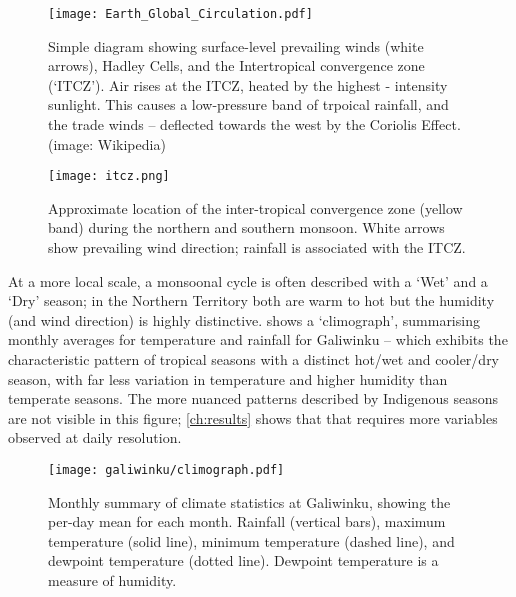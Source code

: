 \begin{figure}[p]
    \centering
    \texttt{[image: Earth\_Global\_Circulation.pdf]}
    \caption[Hadley Cells and trade-winds]{
        Simple diagram showing surface-level prevailing winds (white arrows),
        Hadley Cells, and the Intertropical convergence zone (`ITCZ').
        Air rises at the ITCZ, heated by the highest - intensity sunlight.
        This causes a low-pressure band of trpoical rainfall, and the
        trade winds -- deflected towards the west by the Coriolis Effect.
        (image: Wikipedia)}
    \label{fig:hadley-cells}
\vspace{1cm}
    \texttt{[image: itcz.png]}
    \caption[ITCZ showing northern and southern monsoon]{
        Approximate location of the inter-tropical convergence zone
        (yellow band) during the northern and southern monsoon.
        White arrows show prevailing wind direction; rainfall is
        associated with the ITCZ.  \citep[image:][]{boos2014}}
    \label{fig:itcz-india-aus}
\end{figure}

At a more local scale, a monsoonal cycle is often described with a `Wet'
and a `Dry' season; in the Northern Territory both are warm to hot but
the humidity (and wind direction) is highly distinctive.
%
 shows a `climograph', summarising monthly
averages for temperature and rainfall for Galiwinku -- which exhibits the
characteristic pattern of tropical seasons with a distinct hot/wet and
cooler/dry season, with far less variation in temperature and higher
humidity than temperate seasons.
%
The more nuanced patterns described by Indigenous seasons are not visible
in this figure; \cref{ch:results} shows that that requires more variables
observed at daily resolution.

\begin{figure}[h]
    \centering
    \texttt{[image: galiwinku/climograph.pdf]}
    \caption[Monthly Climograph for Galiwinku]{
        Monthly summary of climate statistics at Galiwinku, showing the per-day
        mean for each month.  Rainfall (vertical bars), maximum temperature
        (solid line), minimum temperature (dashed line), and  dewpoint
        temperature (dotted line).  Dewpoint temperature is a measure of humidity.}
    \label{fig:galiwinku-climograph}
\end{figure}

~\\

